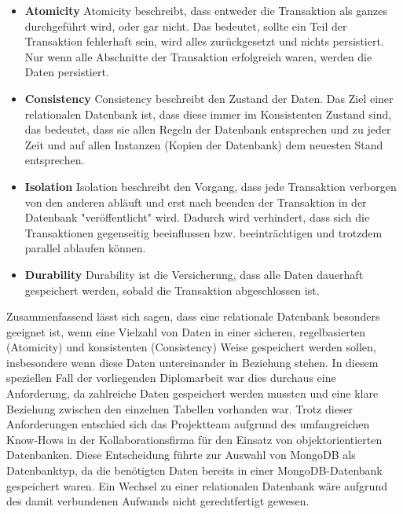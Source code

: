 \begin{itemize}
    \item \textbf{Atomicity}
        \newline
        Atomicity beschreibt, dass entweder die Transaktion als ganzes durchgeführt wird, oder gar nicht. Das bedeutet, sollte ein Teil der Transaktion fehlerhaft sein, wird alles zurückgesetzt und nichts persistiert. Nur wenn alle Abschnitte der Transaktion erfolgreich waren, werden die Daten persistiert.
    \item \textbf{Consistency}
        \newline
       Consistency beschreibt den Zustand der Daten. Das Ziel einer relationalen Datenbank ist, dass diese immer im Konsistenten Zustand sind, das bedeutet, dass sie allen Regeln der Datenbank entsprechen und zu jeder Zeit und auf allen Instanzen (Kopien der Datenbank) dem neuesten Stand entsprechen.
    \item \textbf{Isolation}
        \newline
        Isolation beschreibt den Vorgang, dass jede Transaktion verborgen von den anderen abläuft und erst nach beenden der Transaktion in der Datenbank "veröffentlicht" wird. Dadurch wird verhindert, dass sich die Transaktionen gegenseitig beeinflussen bzw. beeinträchtigen und trotzdem parallel ablaufen können.
    \item \textbf{Durability}
        \newline
        Durability ist die Versicherung, dass alle Daten dauerhaft gespeichert werden, sobald die Transaktion abgeschlossen ist.
\end{itemize}
Zusammenfassend lässt sich sagen, dass eine relationale Datenbank besonders geeignet ist, wenn eine Vielzahl von Daten in einer sicheren, regelbasierten (Atomicity) und konsistenten (Consistency) Weise gespeichert werden sollen, insbesondere wenn diese Daten untereinander in Beziehung stehen. In diesem speziellen Fall der vorliegenden Diplomarbeit war dies durchaus eine Anforderung, da zahlreiche Daten gespeichert werden mussten und eine klare Beziehung zwischen den einzelnen Tabellen vorhanden war.
\newline
Trotz dieser Anforderungen entschied sich das Projektteam aufgrund des umfangreichen Know-Hows in der Kollaborationsfirma für den Einsatz von objektorientierten Datenbanken. Diese Entscheidung führte zur Auswahl von MongoDB als Datenbanktyp, da die benötigten Daten bereits in einer MongoDB-Datenbank gespeichert waren. Ein Wechsel zu einer relationalen Datenbank wäre aufgrund des damit verbundenen Aufwands nicht gerechtfertigt gewesen.

